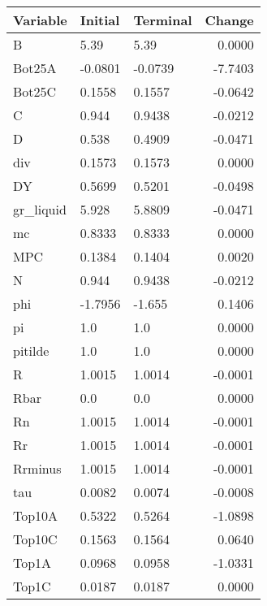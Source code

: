 \begin{table}
\centering
\label{tab:stst_comparison_end_L_limit_permanent}
\begin{tabular}{lllr}
\toprule
                Variable & Initial & Terminal &  Change \\
\midrule
                       B &    5.39 &     5.39 &  0.0000 \\
                  Bot25A & -0.0801 &  -0.0739 & -7.7403 \\
                  Bot25C &  0.1558 &   0.1557 & -0.0642 \\
                       C &   0.944 &   0.9438 & -0.0212 \\
                       D &   0.538 &   0.4909 & -0.0471 \\
                     div &  0.1573 &   0.1573 &  0.0000 \\
                      DY &  0.5699 &   0.5201 & -0.0498 \\
               gr\_liquid &   5.928 &   5.8809 & -0.0471 \\
                      mc &  0.8333 &   0.8333 &  0.0000 \\
                     MPC &  0.1384 &   0.1404 &  0.0020 \\
                       N &   0.944 &   0.9438 & -0.0212 \\
                     phi & -1.7956 &   -1.655 &  0.1406 \\
                      pi &     1.0 &      1.0 &  0.0000 \\
                 pitilde &     1.0 &      1.0 &  0.0000 \\
                       R &  1.0015 &   1.0014 & -0.0001 \\
                    Rbar &     0.0 &      0.0 &  0.0000 \\
                      Rn &  1.0015 &   1.0014 & -0.0001 \\
                      Rr &  1.0015 &   1.0014 & -0.0001 \\
                 Rrminus &  1.0015 &   1.0014 & -0.0001 \\
                     tau &  0.0082 &   0.0074 & -0.0008 \\
                  Top10A &  0.5322 &   0.5264 & -1.0898 \\
                  Top10C &  0.1563 &   0.1564 &  0.0640 \\
                   Top1A &  0.0968 &   0.0958 & -1.0331 \\
                   Top1C &  0.0187 &   0.0187 &  0.0000 \\

\end{tabular}
\end{table}
